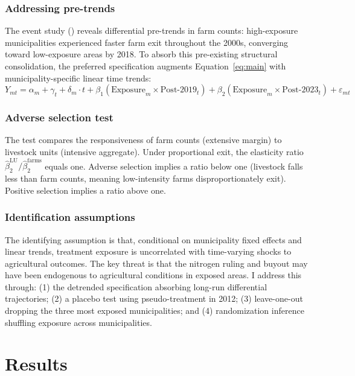 \documentclass[12pt]{article}
\begin{document}
\subsubsection*{Addressing pre-trends} The event study () reveals differential pre-trends in farm counts: high-exposure municipalities experienced faster farm exit throughout the 2000s, converging toward low-exposure areas by 2018. To absorb this pre-existing structural consolidation, the preferred specification augments Equation~\eqref{eq:main} with municipality-specific linear time trends:
\begin{equation}
\label{eq:detrended}
Y_{mt} = \alpha_m + \gamma_t + \delta_m \cdot t + \beta_1 (\text{Exposure}_m \times \text{Post-2019}_t) + \beta_2 (\text{Exposure}_m \times \text{Post-2023}_t) + \varepsilon_{mt}
\end{equation}

\subsubsection*{Adverse selection test} The test compares the responsiveness of farm counts (extensive margin) to livestock units (intensive aggregate). Under proportional exit, the elasticity ratio $\hat{\beta}_2^{\text{LU}} / \hat{\beta}_2^{\text{farms}}$ equals one. Adverse selection implies a ratio below one (livestock falls less than farm counts, meaning low-intensity farms disproportionately exit). Positive selection implies a ratio above one.

\subsubsection*{Identification assumptions} The identifying assumption is that, conditional on municipality fixed effects and linear trends, treatment exposure is uncorrelated with time-varying shocks to agricultural outcomes. The key threat is that the nitrogen ruling and buyout may have been endogenous to agricultural conditions in exposed areas. I address this through: (1) the detrended specification absorbing long-run differential trajectories; (2) a placebo test using pseudo-treatment in 2012; (3) leave-one-out dropping the three most exposed municipalities; and (4) randomization inference shuffling exposure across municipalities.


\section{Results}
\label{sec:results}
\end{document}

